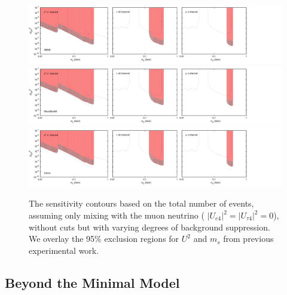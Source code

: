 \documentclass[11pt, a4paper]{article}
\begin{document}
\begin{figure}[t]
\center
\includegraphics[width=1.0\textwidth,clip,trim=0 20 300 15]{figures/sbnd_all_panels_um4.pdf}
\includegraphics[width=1.0\textwidth,clip,trim=0 20 300 15]{figures/muboone_all_panels_um4.pdf}
\includegraphics[width=1.0\textwidth,clip,trim=0 20 300 15]{figures/icarus_all_panels_um4.pdf}

\caption{\label{fig:no_cuts_scaled_bkg_um4_only}The sensitivity contours based on the total
number of events, assuming only mixing with the muon neutrino ( $\vert U_{e 4}\vert^2=\vert U_{\tau 4}\vert^2=0$), without cuts but with varying degrees of background
suppression. We overlay the 95\% exclusion regions for $U^2$ and $m_s$ from
previous experimental work.}

\end{figure}



\subsection{\label{sec:BMM}Beyond the Minimal Model}
\end{document}
